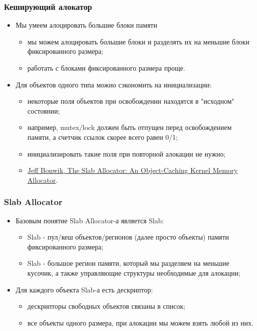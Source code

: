 \begin{frame}
\frametitle{Кеширующий алокатор}
\begin{itemize}
  \item Мы умеем алоцировать большие блоки памяти
  \begin{itemize}
    \item мы можем алоцировать большие блоки и разделять их на меньшие блоки
    фиксированного размера;
    \item работать с блоками фиксированного размера проще.
  \end{itemize}
  \item Для объектов одного типа можно сэкономить на инициализации:
  \begin{itemize}
    \item некоторые поля объектов при освобождении находятся в "исходном"
    состоянии;
    \item например, mutex/lock должен быть отпущен перед освобождением памяти, а
    счетчик ссылок скорее всего равен 0/1;
    \item инициализировать такие поля при повторной алокации не нужно;
    \item \href{https://www.usenix.org/legacy/publications/library/proceedings/bos94/full_papers/bonwick.a}{Jeff Bonwik, The Slab Allocator: An Object-Caching
    Kernel Memory Allocator}.
  \end{itemize}
\end{itemize}
\end{frame}

\begin{frame}
\frametitle{Slab Allocator}
\begin{itemize}
  \item Базовым понятие Slab Allocator-а является Slab:
  \begin{itemize}
    \item Slab - пул/кеш объектов/регионов (далее просто объекты) памяти
    фиксированного размера;
    \item Slab - большое регион памяти, который мы разделяем на меньшие кусочик,
    а также управляющие структуры необходимые для алокации;
  \end{itemize}
  \item Для каждого объекта Slab-а есть дескриптор:
  \begin{itemize}
    \item дескрипторы свободных объектов связаны в список;
    \item все объекты одного размера, при алокации мы можем взять любой из них.
  \end{itemize}
\end{itemize}
\end{frame}

